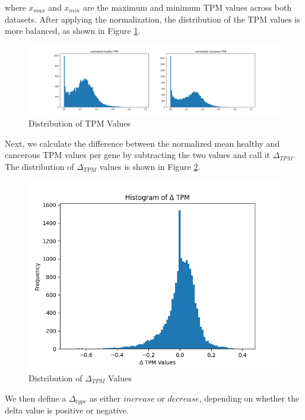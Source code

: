 where $x_{max}$ and $x_{min}$ are the maximum and minimum TPM values across both datasets.
After applying the normalization, the distribution of the TPM values is more balanced, as shown in Figure \ref{fig:03_02_normalized_tpm}.

\begin{figure}[h]
\centering
\includegraphics[scale=0.35]{figures/03_02_normalized_tpm}
\caption{Distribution of TPM Values}
\label{fig:03_02_normalized_tpm}
\end{figure}


Next, we calculate the difference between the normalized mean healthy and cancerous TPM values per gene
by subtracting the two values and call it $\Delta_{TPM}$.
The distribution of $\Delta_{TPM}$ values is shown in Figure \ref{fig:03_02_delta_tpm}.

\begin{figure}[h]
\centering
\includegraphics[scale=0.5]{figures/03_02_delta_tpm}
\caption{Distribution of $\Delta_{TPM}$ Values}
\label{fig:03_02_delta_tpm}
\end{figure}

We then define a $\Delta_{type}$ as either $increase$ or $decrease$, depending on whether the delta value is positive or negative.


